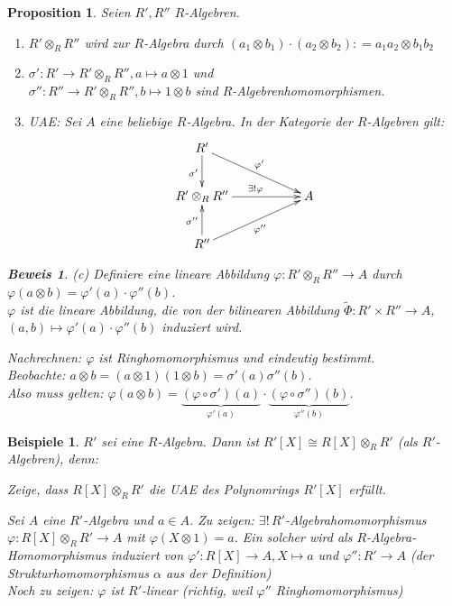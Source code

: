 \documentclass[a4paper,12pt]{scrbook}
\theoremstyle{break}
\newtheorem{Prop}[Def]{Proposition}
\theoremstyle{nonumberbreak}
\newtheorem{Bew}{Beweis}
\newtheorem{nnBsp}{Beispiele}
\theoremstyle{nonumberplain}
\newcommand{\defeqr}[0]{\mathrel{\mathop:}=}
\begin{document}
\begin{Prop}
  \label{1.16}
  Seien $R', R''$ $R$-Algebren.
  \begin{enumerate}
  \item $R'\otimes_R R''$ wird zur $R$-Algebra durch $(a_1\otimes b_1)\cdot (a_2 \otimes b_2)\defeqr a_1a_2\otimes b_1 b_2$
  \item $\sigma': R'\to R'\otimes_R R'', a\mapsto a\otimes 1$ und \\
    $\sigma'': R''\to R'\otimes_R R'', b\mapsto 1\otimes b$
    sind $R$-Algebrenhomomorphismen.
  \item UAE: Sei $A$ eine beliebige $R$-Algebra. In der Kategorie der $R$-Algebren gilt:
    \[
    \begin{xy}
      \xymatrix{
        R' \ar[d]_{\sigma'} \ar[drr]^{\varphi'}    & & \\
        R' \otimes_R R'' \ar[rr]^{\exists!\varphi} & & A \\
        R'' \ar[u]^{\sigma''} \ar[urr]_{\varphi''} & &
      }
    \end{xy}
    \]
  \end{enumerate}

  \begin{Bew}
    (c) Definiere eine lineare Abbildung $\varphi : R'\otimes_R R'' \to A$ durch $\varphi(a \otimes b) = \varphi'(a) \cdot \varphi''(b)$.\\
    $\varphi$ ist die lineare Abbildung, die von der bilinearen Abbildung $\tilde{\Phi} : R' \times R'' \rightarrow A$, $(a, b) \mapsto \varphi'(a) \cdot \varphi''(b)$ induziert wird.

    Nachrechnen: $\varphi$ ist Ringhomomorphismus und eindeutig bestimmt.\\
    Beobachte: $a \otimes b = (a \otimes 1)(1 \otimes b)=\sigma'(a) \sigma''(b)$.\\
    Also muss gelten: $\varphi(a \otimes b) = \underbrace{(\varphi \circ \sigma')(a)}_{\varphi'(a)} \cdot \underbrace{(\varphi \circ \sigma'')(b)}_{\varphi''(b)}$.
  \end{Bew}

\end{Prop}

\begin{nnBsp}
$R'$ sei eine $R$-Algebra. Dann ist $R'[X] \cong R[X] \otimes_R R'$ (als $R'$-Algebren), denn:

Zeige, dass $R[X] \otimes_R R'$ die UAE des Polynomrings $R'[X]$ erfüllt.

Sei $A$ eine $R'$-Algebra und $a \in A$. Zu zeigen: $\exists!\, R'$-Algebrahomomorphismus $\varphi: R[X] \otimes_R R' \rightarrow A$ mit
$\varphi(X \otimes 1 ) = a$. Ein solcher wird als $R$-Algebra-Homomorphismus induziert von $\varphi': R[X] \rightarrow A, X \mapsto a$
und $\varphi'': R' \rightarrow A$ (der Strukturhomomorphismus $\alpha$ aus der Definition)\\
Noch zu zeigen: $\varphi$ ist $R'$-linear (richtig, weil $\varphi''$ Ringhomomorphismus)
\end{nnBsp}
\end{document}
